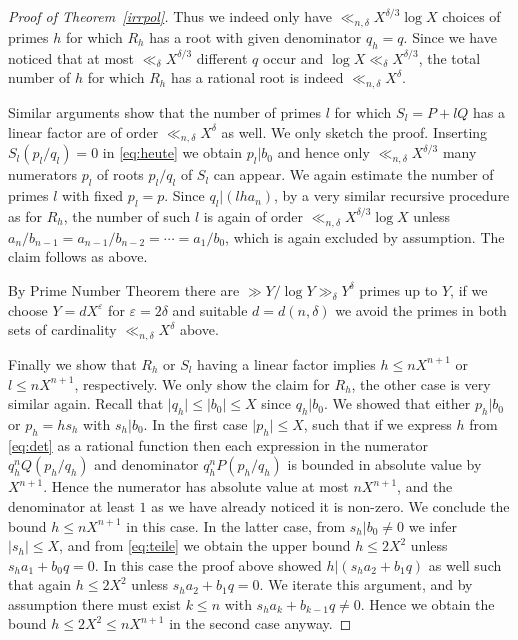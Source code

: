 \documentclass[12pt]{amsart}
\theoremstyle{definition}
\begin{document}
\begin{proof}[Proof of Theorem~\ref{irrpol}]
Thus we indeed only have $\ll_{n,\delta} X^{\delta/3} \log X$ choices of 
primes $h$ for which $R_{h}$ has a root
with given denominator $q_{h}=q$. Since we have noticed
that at most $\ll_{\delta} X^{\delta/3}$ different $q$ occur
and $\log X\ll_{\delta} X^{\delta/3}$,
the total number of $h$ for which $R_{h}$ has a rational 
root is indeed $\ll_{n,\delta} X^{\delta}$.

Similar arguments show that the number of primes $l$ 
for which $S_{l}=P+lQ$ has a linear factor are of order 
$\ll_{n,\delta} X^{\delta}$ as well. We only sketch the proof.
Inserting $S_{l}(p_{l}/q_{l})=0$ in \eqref{eq:heute} we obtain
$p_{l}\vert b_{0}$ and hence only $\ll_{n,\delta} X^{\delta/3}$ 
many numerators $p_{l}$ of roots $p_{l}/q_{l}$
of $S_{l}$ can appear. We again estimate the number 
of primes $l$ with fixed $p_{l}=p$. 
Since $q_{l}\vert (lha_{n})$, by a very 
similar recursive procedure as for $R_{h}$, 
the number of such $l$ is again of
order $\ll_{n,\delta} X^{\delta/3}\log X$
unless $a_{n}/b_{n-1}=a_{n-1}/b_{n-2}=\cdots=a_{1}/b_{0}$,
which is again excluded by assumption. The claim follows as above.

By Prime Number Theorem there 
are $\gg Y/\log Y\gg_{\delta} Y^{\delta}$
primes up to $Y$, if we choose $Y=dX^{\varepsilon}$ 
for $\varepsilon=2\delta$ and suitable $d=d(n,\delta)$
we avoid the primes in both
sets of cardinality $\ll_{n,\delta} X^{\delta}$ above.

Finally we show that $R_{h}$ or $S_{l}$
having a linear factor implies $h\leq nX^{n+1}$ or $l\leq nX^{n+1}$,
respectively. We only show the claim for $R_{h}$, the other case 
is very similar again. Recall that
$\vert q_{h}\vert \leq \vert b_{0}\vert \leq X$ 
since $q_{h}\vert b_{0}$.
We showed that either $p_{h}\vert b_{0}$ or $p_{h}=hs_{h}$
with $s_{h}\vert b_{0}$. In the first case 
$\vert p_{h}\vert \leq X$,
such that if we express $h$ from \eqref{eq:det} 
as a rational function then
each expression in the numerator $q_{h}^{n}Q(p_{h}/q_{h})$
and denominator $q_{h}^{n}P(p_{h}/q_{h})$ is bounded 
in absolute value by $X^{n+1}$. Hence the numerator 
has absolute value at most
$nX^{n+1}$, and the denominator at least $1$
as we have already noticed it is non-zero.
We conclude the bound $h\leq nX^{n+1}$ in this case.
In the latter case, from $s_{h}\vert b_{0}\neq 0$ we 
infer $\vert s_{h}\vert\leq X$, and from \eqref{eq:teile}
we obtain the upper bound $h\leq 2X^{2}$ unless 
$s_{h}a_{1}+b_{0}q=0$. In this case the proof above 
showed $h\vert (s_{h}a_{2}+b_{1}q)$ as well
such that again $h\leq 2X^{2}$ unless $s_{h}a_{2}+b_{1}q=0$. 
We iterate this argument, and by assumption there must 
exist $k\leq n$ with 
$s_{h}a_{k}+b_{k-1}q\neq 0$. Hence we obtain the bound 
$h\leq 2X^{2}\leq nX^{n+1}$ in the second case anyway.
\end{proof}
\end{document}
